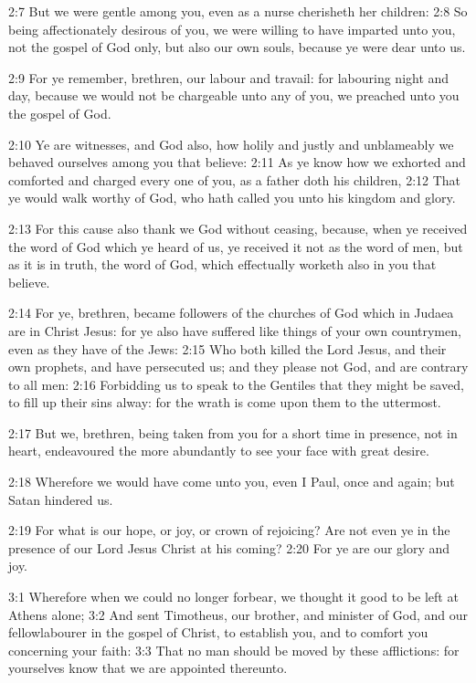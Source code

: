 2:7 But we were gentle among you, even as a nurse cherisheth her children: 2:8 So being affectionately desirous of you, we were willing to have imparted unto you, not the gospel of God only, but also our own souls, because ye were dear unto us.

2:9 For ye remember, brethren, our labour and travail: for labouring night and day, because we would not be chargeable unto any of you, we preached unto you the gospel of God.

2:10 Ye are witnesses, and God also, how holily and justly and unblameably we behaved ourselves among you that believe: 2:11 As ye know how we exhorted and comforted and charged every one of you, as a father doth his children, 2:12 That ye would walk worthy of God, who hath called you unto his kingdom and glory.

2:13 For this cause also thank we God without ceasing, because, when ye received the word of God which ye heard of us, ye received it not as the word of men, but as it is in truth, the word of God, which effectually worketh also in you that believe.

2:14 For ye, brethren, became followers of the churches of God which in Judaea are in Christ Jesus: for ye also have suffered like things of your own countrymen, even as they have of the Jews: 2:15 Who both killed the Lord Jesus, and their own prophets, and have persecuted us; and they please not God, and are contrary to all men: 2:16 Forbidding us to speak to the Gentiles that they might be saved, to fill up their sins alway: for the wrath is come upon them to the uttermost.

2:17 But we, brethren, being taken from you for a short time in presence, not in heart, endeavoured the more abundantly to see your face with great desire.

2:18 Wherefore we would have come unto you, even I Paul, once and again; but Satan hindered us.

2:19 For what is our hope, or joy, or crown of rejoicing? Are not even ye in the presence of our Lord Jesus Christ at his coming?  2:20 For ye are our glory and joy.

3:1 Wherefore when we could no longer forbear, we thought it good to be left at Athens alone; 3:2 And sent Timotheus, our brother, and minister of God, and our fellowlabourer in the gospel of Christ, to establish you, and to comfort you concerning your faith: 3:3 That no man should be moved by these afflictions: for yourselves know that we are appointed thereunto.

